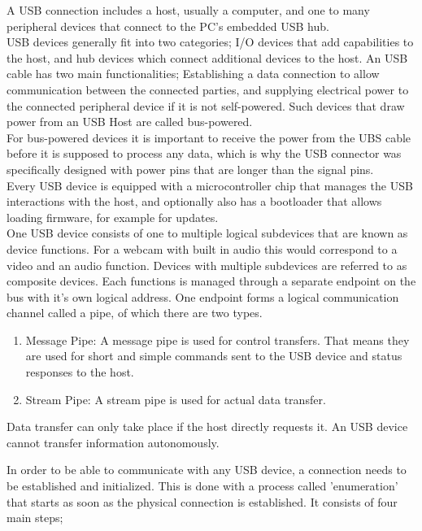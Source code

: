 A USB connection includes a host, usually a computer, and one to many peripheral devices that connect to the PC's embedded USB hub.  \\
USB devices generally fit into two categories; I/O devices that add capabilities to the host, and hub devices which connect additional devices to the host. An USB cable has two main functionalities; Establishing a data connection to allow communication between the connected parties, and supplying electrical power to the connected peripheral device if it is not self-powered. Such devices that draw power from an USB Host are called bus-powered. \\ 
For bus-powered devices it is important to receive the power from the UBS cable before it is supposed to process any data, which is why the USB connector was specifically designed with power pins that are longer than the signal pins.\\
Every USB device is equipped with a microcontroller chip that manages the USB interactions with the host, and optionally also has a bootloader that allows loading firmware, for example for updates. \\
One USB device consists of one to multiple logical subdevices that are known as device functions. For a webcam with built in audio this would correspond to a video and an audio function. Devices with multiple subdevices are referred to as composite devices. Each functions is managed through a separate endpoint on the bus with it's own logical address. One endpoint forms a logical communication channel called a pipe, of which there are two types.  
\begin{enumerate}
    \item Message Pipe: A message pipe is used for control transfers. That means they are used for short and simple commands sent to the USB device and status responses to the host.
    \item Stream Pipe: A stream pipe is used for actual data transfer.
\end{enumerate}
Data transfer can only take place if the host directly requests it. An USB device cannot transfer information autonomously. 

In order to be able to communicate with any USB device, a connection needs to be established and initialized. This is done with a process called 'enumeration' that starts as soon as the physical connection is established. It consists of four main steps;

